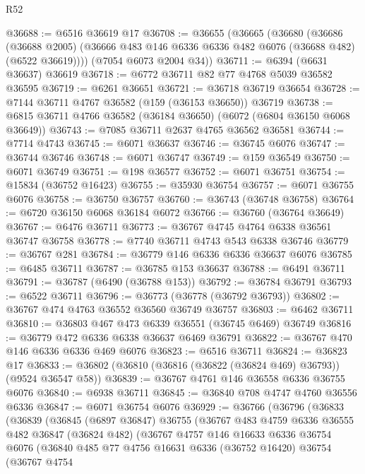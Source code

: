 \begin{lexlean}{R52}
\begin{coremodule}
@36688 := @6516 @36619 @17
@36708 := @36655
    (@36665
      (@36680
        (@36686
          (@36688 @2005)
          (@36666 @483 @146 @6336 @6336 @482 @6076 (@36688 @482) (@6522 @36619))))
      (@7054 @6073 @2004 @34))
@36711 := @6394 (@6631 @36637) @36619
@36718 := @6772 @36711 @82 @77 @4768 @5039 @36582 @36595
@36719 := @6261 @36651
@36721 := @36718 @36719 @36654
@36728 := @7144 @36711 @4767 @36582 (@159 (@36153 @36650)) @36719
@36738 := @6815 @36711 @4766 @36582 (@36184 @36650) (@6072 (@6804 @36150 @6068 @36649))
@36743 := @7085 @36711 @2637 @4765 @36562 @36581
@36744 := @7714 @4743
@36745 := @6071 @36637
@36746 := @36745 @6076
@36747 := @36744 @36746
@36748 := @6071 @36747
@36749 := @159 @36549
@36750 := @6071 @36749
@36751 := @198 @36577
@36752 := @6071 @36751
@36754 := @15834 (@36752 @16423)
@36755 := @35930 @36754
@36757 := @6071 @36755 @6076
@36758 := @36750 @36757
@36760 := @36743 (@36748 @36758)
@36764 := @6720 @36150 @6068 @36184 @6072
@36766 := @36760 (@36764 @36649)
@36767 := @6476 @36711
@36773 := @36767 @4745 @4764 @6338 @36561 @36747 @36758
@36778 := @7740 @36711 @4743 @543 @6338 @36746
@36779 := @36767 @281
@36784 := @36779 @146 @6336 @6336 @36637 @6076
@36785 := @6485 @36711
@36787 := @36785 @153 @36637
@36788 := @6491 @36711
@36791 := @36787 (@6490 (@36788 @153))
@36792 := @36784 @36791
@36793 := @6522 @36711
@36796 := @36773 (@36778 (@36792 @36793))
@36802 := @36767 @474 @4763 @36552 @36560 @36749 @36757
@36803 := @6462 @36711
@36810 := @36803 @467 @473 @6339 @36551 (@36745 @6469) @36749
@36816 := @36779 @472 @6336 @6338 @36637 @6469 @36791
@36822 := @36767 @470 @146 @6336 @6336 @469 @6076
@36823 := @6516 @36711
@36824 := @36823 @17
@36833 := @36802 (@36810 (@36816 (@36822 (@36824 @469) @36793)) (@9524 @36547 @58))
@36839 := @36767 @4761 @146 @36558 @6336 @36755 @6076
@36840 := @6938 @36711
@36845 := @36840 @708 @4747 @4760 @36556 @6336
@36847 := @6071 @36754 @6076
@36929 := @36766
    (@36796
      (@36833
        (@36839
          (@36845
            (@6897 @36847)
            @36755
            (@36767
              @483
              @4759
              @6336
              @36555
              @482
              @36847
              (@36824 @482)
              (@36767
                @4757
                @146
                @16633
                @6336
                @36754
                @6076
                (@36840
                  @485
                  @77
                  @4756
                  @16631
                  @6336
                  (@36752 @16420)
                  @36754
                  (@36767
                    @4754

\end{coremodule}
\end{lexlean}
